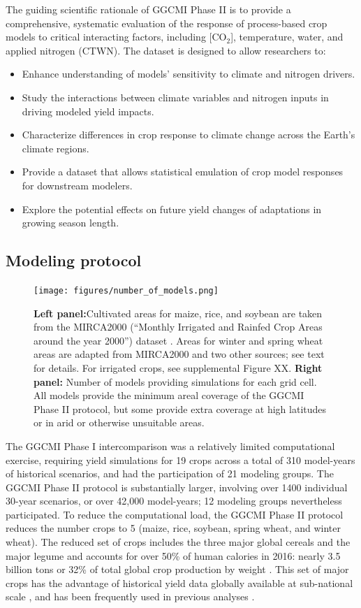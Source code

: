 \documentclass[gmd, manuscript]{copernicus} %
\begin{document}
The guiding scientific rationale of GGCMI Phase II is to provide a comprehensive, systematic evaluation of the response of process-based crop models to critical interacting factors, including [CO$_2$], temperature, water, and applied nitrogen (CTWN). 
The dataset is designed to allow researchers to:
\begin{itemize}
    \item Enhance understanding of models’ sensitivity to climate and nitrogen drivers.
    \item Study the interactions between climate variables and nitrogen inputs in driving modeled yield impacts. 
    \item Characterize differences in crop response to climate change across the Earth's climate regions.
    \item Provide a dataset that allows statistical emulation of crop model responses for downstream modelers.
    \item Explore the potential effects on future yield changes of adaptations in growing season length.
\end{itemize}
\vspace{-0.05in}


\subsection{Modeling protocol}
\begin{figure}[ht]
  \centering
  \texttt{[image: figures/number\_of\_models.png]}
  \caption{
  \textbf{Left panel:}Cultivated areas for maize, rice, and soybean are taken from the MIRCA2000 (``Monthly Irrigated and Rainfed Crop Areas around the year 2000'') dataset \citep{Portmann2010}. 
  Areas for winter and spring wheat areas are adapted from MIRCA2000 and two other sources; see text for details.  For irrigated crops, see supplemental Figure XX.
  \textbf{Right panel:} Number of models providing simulations for each grid cell.  
  All models provide the minimum areal coverage of the GGCMI Phase II protocol, but some provide extra coverage at high latitudes or in arid or otherwise unsuitable areas.}
  \label{fig:crop_area}
\end{figure}

The GGCMI Phase I intercomparison was a relatively limited computational exercise, requiring yield simulations for 19 crops across a total of 310 model-years of historical scenarios, and had the participation of 21 modeling groups.
The GGCMI Phase II protocol is substantially larger, involving over 1400 individual 30-year scenarios, or over 42,000 model-years; 12 modeling groups nevertheless participated. To reduce the computational load, the GGCMI Phase II protocol reduces the number crops to 5 (maize, rice, soybean, spring wheat, and winter wheat). 
The reduced set of crops includes the three major global cereals and the major legume and accounts for over 50\% of human calories in 2016: nearly 3.5 billion tons or 32\% of total global crop production by weight \citep{FAOSTAT}. 
This set of major crops has the advantage of historical yield data globally available at sub-national scale \citep{Ray2012,iizumi_historical_2014}, and has been frequently used in previous analyses \citep[e.g.][]{muller_global_2017,porwollik_spatial_2016}.
\end{document}
